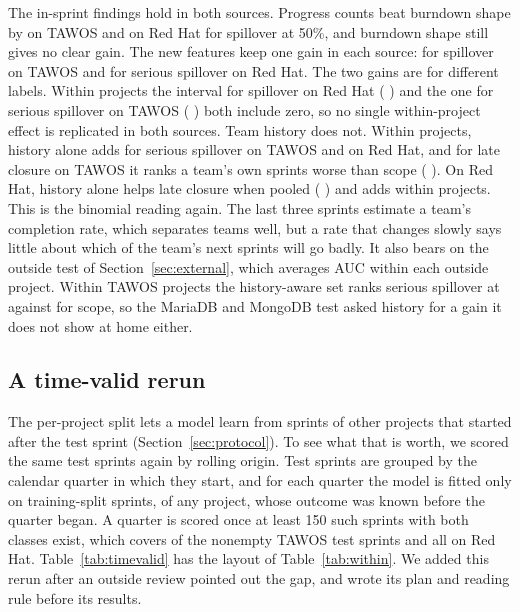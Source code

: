 \documentclass[journal]{IEEEtran}
\begin{document}
The in-sprint findings hold in both sources. Progress counts beat burndown shape by \dIWWkSpB{} \cIWWkSpB{} on TAWOS and \dIYWkSpB{} \cIYWkSpB{} on Red Hat for spillover at 50\%, and burndown shape still gives no clear gain. The new features keep one gain in each source: \dPWNewSp{} \cPWNewSp{} for spillover on TAWOS and \dPYNewSs{} \cPYNewSs{} for serious spillover on Red Hat. The two gains are for different labels. Within projects the interval for spillover on Red Hat (\dPYNewSp{} \cPYNewSp) and the one for serious spillover on TAWOS (\dPWNewSs{} \cPWNewSs) both include zero, so no single within-project effect is replicated in both sources. Team history does not. Within projects, history alone adds \dPWStrSs{} \cPWStrSs{} for serious spillover on TAWOS and \dPYStrSs{} \cPYStrSs{} on Red Hat, and for late closure on TAWOS it ranks a team's own sprints worse than scope (\dPWStrLc{} \cPWStrLc). On Red Hat, history alone helps late closure when pooled (\dPXStrLc{} \cPXStrLc) and adds \dPYStrLc{} within projects. This is the binomial reading again. The last three sprints estimate a team's completion rate, which separates teams well, but a rate that changes slowly says little about which of the team's next sprints will go badly. It also bears on the outside test of Section~\ref{sec:external}, which averages AUC within each outside project. Within TAWOS projects the history-aware set ranks serious spillover at \wPTSsNew{} against \wPTSsScope{} for scope, so the MariaDB and MongoDB test asked history for a gain it does not show at home either.

\subsection{A time-valid rerun}
\label{sec:timevalid}

The per-project split lets a model learn from sprints of other projects that started after the test sprint (Section~\ref{sec:protocol}). To see what that is worth, we scored the same test sprints again by rolling origin. Test sprints are grouped by the calendar quarter in which they start, and for each quarter the model is fitted only on training-split sprints, of any project, whose outcome was known before the quarter began. A quarter is scored once at least 150 such sprints with both classes exist, which covers \TvNT{} of the \TvNallT{} nonempty TAWOS test sprints and all \TvNallR{} on Red Hat. Table~\ref{tab:timevalid} has the layout of Table~\ref{tab:within}. We added this rerun after an outside review pointed out the gap, and wrote its plan and reading rule before its results.
\end{document}
